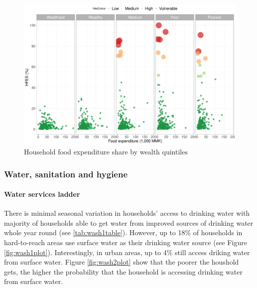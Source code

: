 \documentclass[12pt,a4paper]{article}
\let\oldparagraph\paragraph
\renewcommand{\paragraph}[1]{\oldparagraph{#1}\mbox{}}
\begin{document}
\begin{figure}[H]

{\centering \includegraphics{kayinReport_files/figure-latex/hfesScatterPlot2-1} 

}

\caption{Household food expenditure share by wealth quintiles}\label{fig:hfesScatterPlot2}
\end{figure}

\hypertarget{wash-results}{%
\subsubsection{Water, sanitation and hygiene}\label{wash-results}}

\hypertarget{water-results}{%
\paragraph{Water services ladder}\label{water-results}}

There is minimal seasonal variation in households' access to drinking water with majority of households able to get water from improved sources of drinking water whole year round (see \ref{tab:wash1table}). However, up to 18\% of households in hard-to-reach areas use surface water as their drinking water source (see Figure \ref{fig:wash1plot}). Interestingly, in urban areas, up to 4\% still access driking water from surface water. Figure \ref{fig:wash2plot} show that the poorer the houshold gets, the higher the probability that the household is accessing drinking water from surface water.
\end{document}
